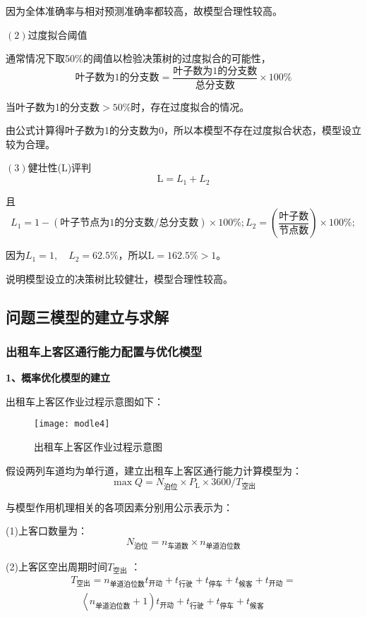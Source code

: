 \documentclass[withoutpreface,bwprint]{cumcmthesis} %
\begin{document}
因为全体准确率与相对预测准确率都较高，故模型合理性较高。

$(2)$过度拟合阈值

通常情况下取50$\%$的阈值以检验决策树的过度拟合的可能性，
$$
\text{叶子数为1的分支数}=\frac{\text{叶子数为1的分支数}}{\text{总分支数}} \times 100 \%
$$

当叶子数为1的分支数$>50$$\%$时，存在过度拟合的情况。

由公式计算得叶子数为1的分支数为0，所以本模型不存在过度拟合状态，模型设立较为合理。

$(3)$健壮性(L)评判
$$
\mathrm{L}=L_{1}+L_{2}
$$

且
$$
L_{1}=1-({\text{叶子节点为1的分支数}} / {\text{总分支数}}) \times 100 \% ; 
L_{2}=\left(\frac{{\text{叶子数}}}{{\text{节点数}}}\right) \times 100 \%;
$$

因为$L_{1}=1, \quad L_{2}=62.5 \%$，所以$\mathrm{L}=162.5 \%>1$。

说明模型设立的决策树比较健壮，模型合理性较高。
\newpage
\subsection{问题三模型的建立与求解}
\subsubsection{出租车上客区通行能力配置与优化模型}
\textbf{1、概率优化模型的建立}

出租车上客区作业过程示意图如下：
\begin{figure}[!htbp]
	\centering
	\texttt{[image: modle4]}
	\caption{出租车上客区作业过程示意图}
	\label{fig:circuit-diagram}
\end{figure}

假设两列车道均为单行道，建立出租车上客区通行能力计算模型为：
$$
\max Q=N_{\text {泊位}} \times P_{\mathrm{L}} \times 3600 / T_{\text {空出}}
$$

与模型作用机理相关的各项因素分别用公示表示为：

(1)上客口数量为：
$$
N_{\text{泊位}}=n_{\text{车道数}} \times n_{\text{单道泊位数}}
$$

(2)上客区空出周期时间$T_{\text{空出}}$ ：
$$
\begin{array}{l}{T_{\text{空出}}=n_{\text{单道泊位数}} t_{\text{开动}}+t_{\text{行驶}}+t_{\text{停车}}+t_{\text{候客}}+t_{\text{开动}}=} \\ {\quad\left\langle n_{\text{单道泊位数}}+1\right) t_{\text{开动}}+t_{\text{行驶}}+t_{\text{停车}}+t_{\text{候客}}}\end{array}
$$
\end{document}
